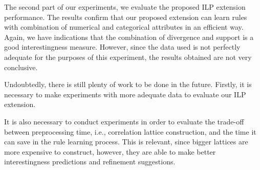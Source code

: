 The second part of our experiments, we evaluate the proposed ILP extension performance. The results confirm that our
proposed extension can learn rules with combination of numerical and categorical attributes in an efficient way. Again,
we have indications that the combination of divergence and support is a good interestingness measure. However, since the
data used is not perfectly adequate for the purposes of this experiment, the results obtained are not very conclusive.

Undoubtedly, there is still plenty of work to be done in the future. Firstly, it is necessary to make experiments with
more adequate data to evaluate our ILP extension. 

It is also necessary to conduct experiments in order to evaluate the trade-off between preprocessing time, i.e.,
correlation lattice construction, and the time it can save in the rule learning process. This is relevant,
since bigger lattices are more expensive to construct, however, they are able to make better interestingness
predictions and refinement suggestions.





























